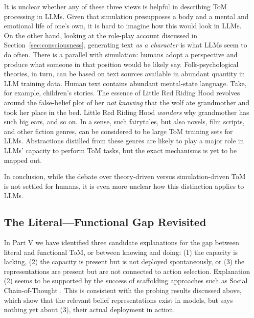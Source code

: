 It is unclear whether any of these three views is helpful in describing ToM processing in LLMs. Given that simulation presupposes a body and a mental and emotional life of one's own, it is hard to imagine how this would look in LLMs. On the other hand, looking at the role-play account discussed in Section~\ref{sec:consciousness}, generating text \emph{as a character} is what LLMs seem to do often. There is a parallel with simulation: humans adopt a perspective and produce what someone in that position would be likely say. Folk-psychological theories, in turn, can be based on text sources available in abundant quantity in LLM training data. Human text contains abundant mental-state language. Take, for example, children's stories. The essence of Little Red Riding Hood revolves around the false-belief plot of her \emph{not knowing} that the wolf ate grandmother and took her place in the bed. Little Red Riding Hood \emph{wonders} why grandmother has such big ears, and so on. In a sense, such fairytales, but also novels, film scripts, and other fiction genres, can be considered to be large ToM training sets for LLMs. Abstractions distilled from these genres are likely to play a major role in LLMs' capacity to perform ToM tasks, but the exact mechanisms is yet to be mapped out. 

In conclusion, while the debate over theory-driven versus simulation-driven ToM is not settled for humans, it is even more unclear how this distinction applies to LLMs.

\subsection{The Literal––Functional Gap Revisited}
In Part V we have identified three candidate explanations for the gap between literal and functional ToM, or between knowing and doing: (1) the capacity is lacking, (2) the capacity is present but is not deployed spontaneously, or (3) the representations are present but are not connected to action selection. Explanation (2) seems to be supported by the success of scaffolding approaches such as Social Chain-of-Thought \citep{akata2025playing}. This is consistent with the probing results discussed above, which show that the relevant belief representations exist in models, but says nothing yet about (3), their actual deployment in action. 

